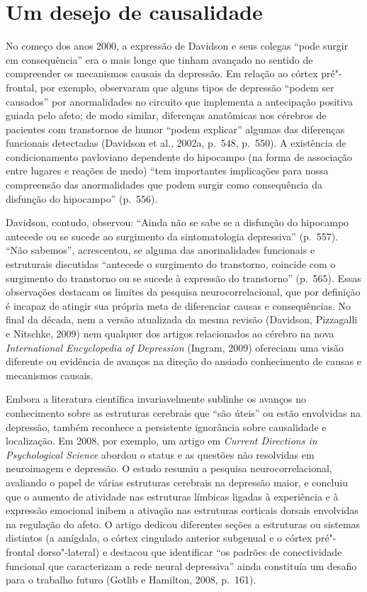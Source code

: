 \section{Um desejo de causalidade}

No começo dos anos 2000, a expressão de Davidson e seus colegas ``pode
surgir em consequência'' era o mais longe que tinham avançado no sentido
de compreender os mecanismos causais da depressão. Em relação ao córtex
pré"-frontal, por exemplo, observaram que alguns tipos de depressão
``podem ser causados'' por anormalidades no circuito que implementa a
antecipação positiva guiada pelo afeto; de modo similar, diferenças
anatômicas nos cérebros de pacientes com transtornos de humor ``podem
explicar'' algumas das diferenças funcionais detectadas (Davidson et
al., 2002a, p.~548, p.~550). A existência de condicionamento pavloviano
dependente do hipocampo (na forma de associação entre lugares e reações
de medo) ``tem importantes implicações para nossa compreensão das
anormalidades que podem surgir como consequência da disfunção do
hipocampo'' (p.~556).

Davidson, contudo, observou: ``Ainda não se sabe se a disfunção do
hipocampo antecede ou se sucede ao surgimento da sintomatologia
depressiva'' (p.~557). ``Não sabemos'', acrescentou, se alguma das
anormalidades funcionais e estruturais discutidas ``antecede o
surgimento do transtorno, coincide com o surgimento do transtorno ou se
sucede à expressão do transtorno'' (p.~565). Essas observações destacam
os limites da pesquisa neurocorrelacional, que por definição é incapaz
de atingir sua própria meta de diferenciar causas e consequências. No
final da década, nem a versão atualizada da mesma revisão (Davidson,
Pizzagalli e Nitschke, 2009) nem qualquer dos artigos relacionados ao
cérebro na nova \emph{International Encyclopedia of Depression} (Ingram,
2009) ofereciam uma visão diferente ou evidência de avanços na direção
do ansiado conhecimento de causas e mecanismos causais.

Embora a literatura científica invariavelmente sublinhe os avanços no
conhecimento sobre as estruturas cerebrais que ``são úteis'' ou estão
envolvidas na depressão, também reconhece a persistente ignorância sobre
causalidade e localização. Em 2008, por exemplo, um artigo em
\emph{Current Directions in Psychological Science} abordou o status e as
questões não resolvidas em neuroimagem e depressão. O estudo resumiu a
pesquisa neurocorrelacional, avaliando o papel de várias estruturas
cerebrais na depressão maior, e concluiu que o aumento de atividade nas
estruturas límbicas ligadas à experiência e à expressão emocional inibem
a ativação nas estruturas corticais dorsais envolvidas na regulação do
afeto. O artigo dedicou diferentes seções a estruturas ou sistemas
distintos (a amígdala, o córtex cingulado anterior subgenual e o córtex
pré"-frontal dorso"-lateral) e destacou que identificar ``os padrões de
conectividade funcional que caracterizam a rede neural depressiva''
ainda constituía um desafio para o trabalho futuro (Gotlib e Hamilton,
2008, p.~161).

